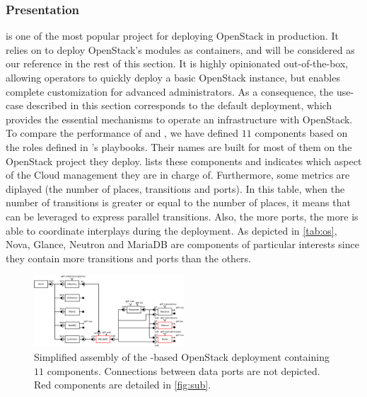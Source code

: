 \subsubsection{Presentation}

\begin{table}
  \begin{center}
    
    \caption{Number of places, transitions, ports and roles for each \mad component
        of the OpenStack assembly of Figure~\ref{fig:full}.}
    \label{tab:os}
  \end{center}
\end{table}

\kolla is one of the most popular project for deploying OpenStack in production.
It relies on \ansible to deploy OpenStack's modules as \docker containers, and
will be considered as our reference in the rest of this section. It is highly
opinionated out-of-the-box, allowing operators to quickly deploy a basic
OpenStack instance, but enables complete customization for advanced
administrators. As a consequence, the use-case described in this section
corresponds to the default \kolla deployment, which provides the essential
mechanisms to operate an infrastructure with OpenStack.
%
To compare the performance of \kolla and \mad, we have defined $11$ \mad
components based on the \ansible roles defined in \kolla's playbooks. Their
names are built for most of them on the OpenStack project they deploy.
 lists these components and indicates which aspect of the Cloud
management they are in charge of. Furthermore, some \mad metrics are diplayed
(\ie the number of places, transitions and ports).
%
In this table, when the number of transitions is greater or equal to the number
of places, it means that \mad can be leveraged to express parallel transitions.
Also, the more ports, the more \mad is able to coordinate interplays during the
deployment. As depicted in \cref{tab:os}, Nova, Glance, Neutron and MariaDB are
components of particular interests since they contain more transitions and ports
than the others.

\begin{figure}
  \begin{center}
    \includegraphics[width=0.5\textwidth]{./images/full.pdf}
    \caption{Simplified \mad assembly of the \kolla-based OpenStack deployment
    containing $11$ components. Connections between data ports are not depicted.
    Red components are detailed in \cref{fig:sub}.}
    \label{fig:full}
  \end{center}
\end{figure}

